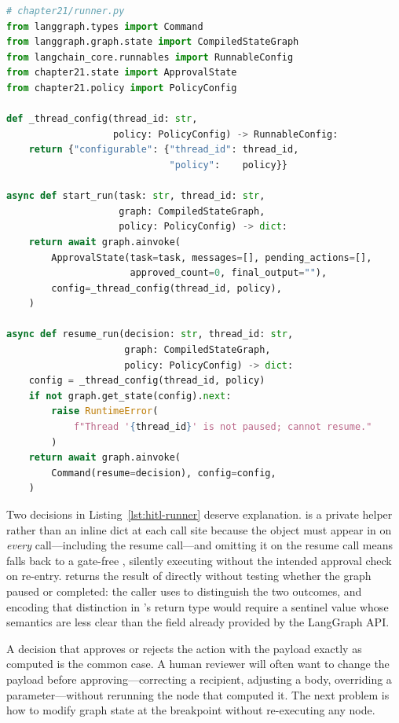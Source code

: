 \begin{lstlisting}[language=Python,
  caption={Thread helpers: construct config, start a run, verify pause
           state, resume with decision},
  label={lst:hitl-runner}]
# chapter21/runner.py
from langgraph.types import Command
from langgraph.graph.state import CompiledStateGraph
from langchain_core.runnables import RunnableConfig
from chapter21.state import ApprovalState
from chapter21.policy import PolicyConfig

def _thread_config(thread_id: str,
                   policy: PolicyConfig) -> RunnableConfig:
    return {"configurable": {"thread_id": thread_id,
                             "policy":    policy}}

async def start_run(task: str, thread_id: str,
                    graph: CompiledStateGraph,
                    policy: PolicyConfig) -> dict:
    return await graph.ainvoke(
        ApprovalState(task=task, messages=[], pending_actions=[],
                      approved_count=0, final_output=""),
        config=_thread_config(thread_id, policy),
    )

async def resume_run(decision: str, thread_id: str,
                     graph: CompiledStateGraph,
                     policy: PolicyConfig) -> dict:
    config = _thread_config(thread_id, policy)
    if not graph.get_state(config).next:
        raise RuntimeError(
            f"Thread '{thread_id}' is not paused; cannot resume."
        )
    return await graph.ainvoke(
        Command(resume=decision), config=config,
    )
\end{lstlisting}

Two decisions in Listing~\ref{lst:hitl-runner} deserve explanation.
 is a private helper rather than an inline dict
at each call site because the  object must appear in
 on \emph{every} call---including the resume
call---and omitting it on the resume call means  falls
back to a gate-free , silently executing without the
intended approval check on re-entry.  returns the result
of  directly without testing whether the graph paused or
completed: the caller uses  to
distinguish the two outcomes, and encoding that distinction in
's return type would require a sentinel value whose
semantics are less clear than the  field already
provided by the LangGraph API.

A decision that approves or rejects the action with the payload exactly as
computed is the common case. A human reviewer will often want to change the
payload before approving---correcting a recipient, adjusting a body,
overriding a parameter---without rerunning the node that computed it. The
next problem is how to modify graph state at the breakpoint without
re-executing any node.


